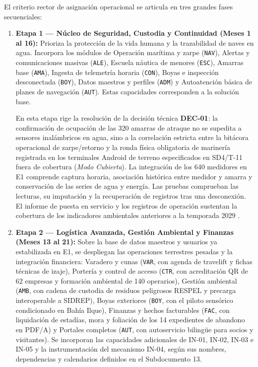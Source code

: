 El criterio rector de asignación operacional se articula en tres grandes fases secuenciales:

\begin{enumerate}
    \item \textbf{Etapa 1 --- Núcleo de Seguridad, Custodia y Continuidad (Meses 1 al 16):} Prioriza la protección de la vida humana y la trazabilidad de naves en agua. Incorpora los módulos de Operación marítima y zarpe (\texttt{NAV}), Alertas y comunicaciones masivas (\texttt{ALE}), Escuela náutica de menores (\texttt{ESC}), Amarras base (\texttt{AMA}), Ingesta de telemetría horaria (\texttt{CON}), Boyas e inspección desconectada (\texttt{BOY}), Datos maestros y perfiles (\texttt{ADM}) y Autoatención básica de planes de navegación (\texttt{AUT}). Estas capacidades corresponden a la solución base.
    
    En esta etapa rige la resolución de la decisión técnica \textbf{DEC-01}: la confirmación de ocupación de las 320 amarras de atraque no se supedita a sensores inalámbricos en agua, sino a la correlación estricta entre la bitácora operacional de zarpe/retorno y la ronda física obligatoria de marinería registrada en los terminales Android de terreno especificados en SD4/T-11 fuera de cobertura (\emph{Modo Cubierta}). La integración de los 640 medidores en E1 comprende captura horaria, asociación histórica entre medidor y amarra y conservación de las series de agua y energía. Las pruebas comprueban las lecturas, su imputación y la recuperación de registros tras una desconexión. El informe de puesta en servicio y los registros de operación sustentan la cobertura de los indicadores ambientales anteriores a la temporada 2029 \parencite[sec.~13.2; cap.~15, RT-03.13, RT-05.10 y RT-05.29]{caso07}.

    \item \textbf{Etapa 2 --- Logística Avanzada, Gestión Ambiental y Finanzas (Meses 13 al 21):} Sobre la base de datos maestros y usuarios ya estabilizada en E1, se despliegan las operaciones terrestres pesadas y la integración financiera: Varadero y cunas (\texttt{VAR}, con agenda de travelift y fichas técnicas de izaje), Portería y control de acceso (\texttt{CTR}, con acreditación QR de 62 empresas y formación ambiental de 140 operarios), Gestión ambiental (\texttt{AMB}, con cadena de custodia de residuos peligrosos RESPEL y precarga interoperable a SIDREP), Boyas exteriores (\texttt{BOY}, con el piloto sensórico condicionado en Bahía Ilque), Finanzas y hechos facturables (\texttt{FAC}, con liquidación de estadías, mora y foliación de los 14 expedientes de abandono en PDF/A) y Portales completos (\texttt{AUT}, con autoservicio bilingüe para socios y visitantes). Se incorporan las capacidades adicionales de IN-01, IN-02, IN-03 e IN-05 y la instrumentación del mecanismo IN-04, según sus nombres, dependencias y calendarios definidos en el Subdocumento 13.


\end{enumerate}

